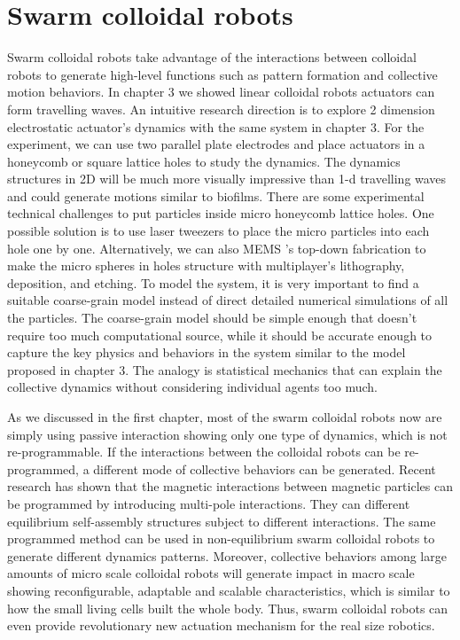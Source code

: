 \section{Swarm colloidal robots}
Swarm colloidal robots take advantage of the interactions between colloidal robots to generate high-level functions such as pattern formation and collective motion behaviors. In chapter 3 we showed linear colloidal robots actuators can form travelling waves. An intuitive research direction is to explore 2 dimension electrostatic actuator's dynamics with the same system in chapter 3. For the experiment, we can use two parallel plate electrodes and place actuators in a honeycomb or square lattice  holes to study the dynamics. The dynamics structures in 2D will be much more visually impressive than  1-d travelling waves and could generate motions similar to biofilms. There are some experimental technical challenges to put particles  inside micro honeycomb lattice holes. One possible solution is to use laser tweezers to place the micro particles into each hole one by one. Alternatively, we can also MEMS 's top-down fabrication to make the micro spheres in  holes structure with multiplayer's lithography, deposition, and etching. To model the system, it is very important to find a suitable coarse-grain model instead of direct detailed numerical simulations of all the particles. The coarse-grain model should be simple enough that doesn't require too much computational source, while it should be accurate enough to capture the key physics and  behaviors in the system similar to the model proposed in chapter 3. The analogy is statistical mechanics that can explain the collective dynamics without considering individual agents too much.

As we discussed in the first chapter, most of the swarm colloidal robots now are simply using passive interaction showing only one type of dynamics, which is not re-programmable. If the interactions between the colloidal robots can be re-programmed, a different mode of collective behaviors can be generated. Recent research has shown that the magnetic interactions between magnetic particles   can be programmed by introducing multi-pole interactions. They can  different  equilibrium self-assembly structures subject to different interactions. \autocite{niu2019magnetic} The same programmed method can be used in non-equilibrium swarm colloidal robots to generate different dynamics patterns. Moreover, collective behaviors among large amounts of micro scale colloidal robots  will generate impact in macro scale showing reconfigurable, adaptable and scalable  characteristics,  which is similar to  how the small living cells built the whole body. Thus, swarm colloidal robots can even provide revolutionary new actuation mechanism for the real size robotics. 
